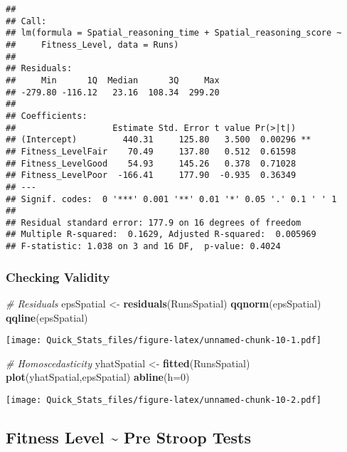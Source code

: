 \documentclass[]{article}
\newenvironment{Shaded}{\begin{snugshade}}{\end{snugshade}}
\newcommand{\KeywordTok}[1]{\textcolor[rgb]{0.13,0.29,0.53}{\textbf{#1}}}
\newcommand{\DataTypeTok}[1]{\textcolor[rgb]{0.13,0.29,0.53}{#1}}
\newcommand{\DecValTok}[1]{\textcolor[rgb]{0.00,0.00,0.81}{#1}}
\newcommand{\StringTok}[1]{\textcolor[rgb]{0.31,0.60,0.02}{#1}}
\newcommand{\CommentTok}[1]{\textcolor[rgb]{0.56,0.35,0.01}{\textit{#1}}}
\newcommand{\NormalTok}[1]{#1}
\begin{document}
\begin{verbatim}
## 
## Call:
## lm(formula = Spatial_reasoning_time + Spatial_reasoning_score ~ 
##     Fitness_Level, data = Runs)
## 
## Residuals:
##     Min      1Q  Median      3Q     Max 
## -279.80 -116.12   23.16  108.34  299.20 
## 
## Coefficients:
##                   Estimate Std. Error t value Pr(>|t|)   
## (Intercept)         440.31     125.80   3.500  0.00296 **
## Fitness_LevelFair    70.49     137.80   0.512  0.61598   
## Fitness_LevelGood    54.93     145.26   0.378  0.71028   
## Fitness_LevelPoor  -166.41     177.90  -0.935  0.36349   
## ---
## Signif. codes:  0 '***' 0.001 '**' 0.01 '*' 0.05 '.' 0.1 ' ' 1
## 
## Residual standard error: 177.9 on 16 degrees of freedom
## Multiple R-squared:  0.1629, Adjusted R-squared:  0.005969 
## F-statistic: 1.038 on 3 and 16 DF,  p-value: 0.4024
\end{verbatim}

\subsubsection{Checking Validity}\label{checking-validity-1}

\begin{Shaded}
\begin{Highlighting}[]
\CommentTok{# Residuals }
\NormalTok{epsSpatial <-}\StringTok{ }\KeywordTok{residuals}\NormalTok{(RunsSpatial) }
\KeywordTok{qqnorm}\NormalTok{(epsSpatial) }
\KeywordTok{qqline}\NormalTok{(epsSpatial) }
\end{Highlighting}
\end{Shaded}

\texttt{[image: Quick\_Stats\_files/figure-latex/unnamed-chunk-10-1.pdf]}

\begin{Shaded}
\begin{Highlighting}[]
\CommentTok{# Homoscedasticity }
\NormalTok{yhatSpatial <-}\StringTok{ }\KeywordTok{fitted}\NormalTok{(RunsSpatial) }
\KeywordTok{plot}\NormalTok{(yhatSpatial,epsSpatial) }
\KeywordTok{abline}\NormalTok{(}\DataTypeTok{h=}\DecValTok{0}\NormalTok{) }
\end{Highlighting}
\end{Shaded}

\texttt{[image: Quick\_Stats\_files/figure-latex/unnamed-chunk-10-2.pdf]}

\subsection{Fitness Level \textasciitilde{} Pre Stroop
Tests}\label{fitness-level-pre-stroop-tests}
\end{document}
